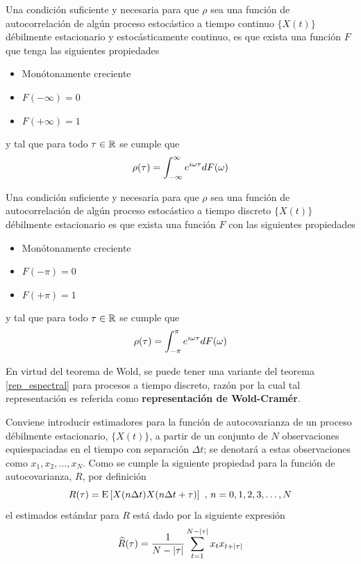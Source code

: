 \begin{teorema}
Una condición suficiente y necesaria para que $\rho$ sea una función de autocorrelación de 
algún proceso estocástico a tiempo continuo $\{X(t)\}$ débilmente estacionario y 
estocásticamente continuo, es que exista una función $F$ que tenga las siguientes propiedades
\begin{itemize}
\item Monótonamente creciente
\item $F(-\infty) = 0$
\item $F(+\infty) = 1$
\end{itemize}
y tal que para todo $\tau \in \mathbb{R}$ se cumple que
\begin{equation*}
\rho(\tau) = \int_{-\infty}^{\infty} e^{i \omega \tau} dF(\omega)
\end{equation*}
\label{t_wienerkhinchin}
\end{teorema}

\begin{teorema}[Wold]
Una condición suficiente y necesaria para que $\rho$ sea una función de autocorrelación de 
algún proceso estocástico a tiempo discreto $\{X(t)\}$ débilmente estacionario es que exista 
una función $F$ con las siguientes propiedades
\begin{itemize}
\item Monótonamente creciente
\item $F(-\pi) = 0$
\item $F(+\pi) = 1$
\end{itemize}
y tal que para todo $\tau \in \mathbb{R}$ se cumple que
\begin{equation*}
\rho(\tau) = \int_{-\pi}^{\pi} e^{i \omega \tau} dF(\omega)
\end{equation*}
\label{t_wold}
\end{teorema}

En virtud del teorema de Wold, se puede tener una variante del teorema \ref{rep_espectral}
para procesos a tiempo discreto, raz\'on por la cual  
tal representaci\'on es referida como \textbf{representaci\'on de Wold-Cram\'er}.


Conviene introducir estimadores para la función de autocovarianza de un proceso débilmente 
estacionario, $\{ X(t) \}$, a partir de un conjunto de $N$ observaciones equiespaciadas en el 
tiempo con separación $\Delta t$; se denotará a estas observaciones como 
$x_1, x_2 , \dots, x_N$. Como se cumple la siguiente propiedad para la función de autocovarianza, 
$R$, por definición
\begin{equation*}
R(\tau) = \mathrm{E}\left[ X(n\Delta t)X(n\Delta t + \tau) \right] \text{  ,  } n = 0, 1, 2,  3,\dots, N
\end{equation*}
el estimados estándar para $R$ está dado por la siguiente expresión
\begin{equation*}
\widehat{R}(\tau) = \frac{1}{N-\left| \tau \right|} 
\sum_{t = 1}^{N-\left| \tau \right|} x_t x_{t+\left| \tau \right|}
\label{estimador_R}
\end{equation*}

